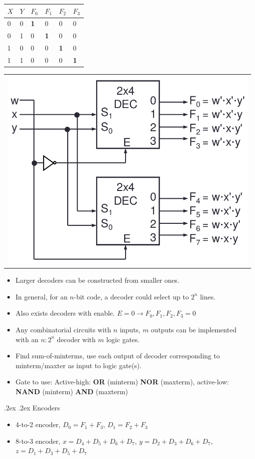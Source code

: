 \documentclass[10pt,landscape,a4paper]{article}
\makeatletter
\renewcommand{\subsection}{\@startsection{subsection}{1}{0mm}%
                                {.2ex}%
                                {.2ex}%
                                {\sffamily\bfseries}}
\makeatother
\begin{document}
\begin{multicols*}{4}
	\begin{tabular}{| l l | l l l l |}
		\hline
		$X$	& $Y$ & $F_0$ & $F_1$ & $F_2$ & $F_3$ \\ \hline
		0 & 0 & \textbf{1} & 0 & 0 & 0 \\
		0 & 1 & 0 & \textbf{1} & 0 & 0 \\
		1 & 0 & 0 & 0 & \textbf{1} & 0 \\
		1 & 1 & 0 & 0 & 0 & \textbf{1} \\
		\hline
	\end{tabular}
	\begin{tabular}{l}
	\includegraphics[width=0.35\linewidth]{larger-decoder}
	\end{tabular}
	\begin{itemize}
		\item Larger decoders can be constructed from smaller ones.
		\item In general, for an $n$-bit code, a decoder could select up to $2^n$ lines.
		\item Also exists decoders with enable. $E=0 \rightarrow F_0, F_1, F_2, F_3 = 0$
		\item Any combinatorial circuits with $n$ inputs, $m$ outputs can be implemented with an $n:2^n$ decoder with $m$ logic gates.
		\item Find sum-of-minterms, use each output of decoder corresponding to minterm/maxter as input to logic gate(s).
		\item Gate to use: Active-high: \textbf{OR} (minterm) \textbf{NOR} (maxterm), active-low: \textbf{NAND} (minterm) \textbf{AND} (maxterm)
	\end{itemize}
	
	\subsection{Encoders}
	\begin{itemize}
		\item 4-to-2 encoder, $D_0 = F_1 + F_3$, $D_1=F_2+F_3$
		\item 8-to-3 encoder, $x=D_4+D_5+D_6+D_7$, $y=D_2+D_3+D_6+D_7$, $z=D_1+D_3+D_5+D_7$
	\end{itemize}
	

\end{multicols*}
\end{document}
